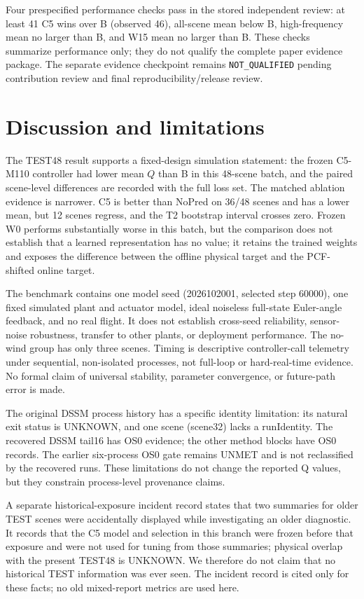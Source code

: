 \documentclass[11pt]{article}
\begin{document}
Four prespecified performance checks pass in the stored independent review: at least 41 C5 wins over B (observed 46), all-scene mean below B, high-frequency mean no larger than B, and W15 mean no larger than B. These checks summarize performance only; they do not qualify the complete paper evidence package. The separate evidence checkpoint remains \texttt{NOT\_QUALIFIED} pending contribution review and final reproducibility/release review.

\section{Discussion and limitations}\label{sec:limitations}
The TEST48 result supports a fixed-design simulation statement: the frozen C5-M110 controller had lower mean $Q$ than B in this 48-scene batch, and the paired scene-level differences are recorded with the full loss set. The matched ablation evidence is narrower. C5 is better than NoPred on 36/48 scenes and has a lower mean, but 12 scenes regress, and the T2 bootstrap interval crosses zero. Frozen W0 performs substantially worse in this batch, but the comparison does not establish that a learned representation has no value; it retains the trained weights and exposes the difference between the offline physical target and the PCF-shifted online target.

The benchmark contains one model seed (2026102001, selected step 60000), one fixed simulated plant and actuator model, ideal noiseless full-state Euler-angle feedback, and no real flight. It does not establish cross-seed reliability, sensor-noise robustness, transfer to other plants, or deployment performance. The no-wind group has only three scenes. Timing is descriptive controller-call telemetry under sequential, non-isolated processes, not full-loop or hard-real-time evidence. No formal claim of universal stability, parameter convergence, or future-path error is made.

The original DSSM process history has a specific identity limitation: its natural exit status is UNKNOWN, and one scene (scene32) lacks a runIdentity. The recovered DSSM tail16 has OS0 evidence; the other method blocks have OS0 records. The earlier six-process OS0 gate remains UNMET and is not reclassified by the recovered runs. These limitations do not change the reported Q values, but they constrain process-level provenance claims.

A separate historical-exposure incident record states that two summaries for older TEST scenes were accidentally displayed while investigating an older diagnostic. It records that the C5 model and selection in this branch were frozen before that exposure and were not used for tuning from those summaries; physical overlap with the present TEST48 is UNKNOWN. We therefore do not claim that no historical TEST information was ever seen. The incident record is cited only for these facts; no old mixed-report metrics are used here.
\end{document}

